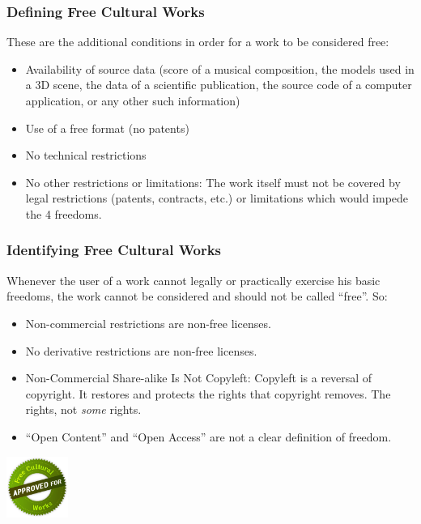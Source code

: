 
\begin{frame}
\frametitle{Defining Free Cultural Works}

These are the additional conditions in order for a work to be considered free:

\begin{itemize}
\item \alert{Availability of source data} (score of a musical composition, the models used in a 3D scene, the data of a scientific publication, the source code of a computer application, or any other such information)
\item \alert{Use of a free format} (no patents)
\item \alert{No technical restrictions}
\item \alert{No other restrictions or limitations:} The work itself must not be covered by legal restrictions (patents, contracts, etc.) or limitations which would impede the 4 freedoms.
\end{itemize}                                                 

\end{frame}



\begin{frame}
\frametitle{Identifying Free Cultural Works}

Whenever the user of a work cannot legally or practically exercise his basic freedoms, the work cannot be considered and should not be called ``free''. So: 

\begin{itemize}
\item \alert{Non-commercial} restrictions are \alert{non-free} licenses.
\item \alert{No derivative} restrictions are \alert{non-free} licenses. 
\item \alert{Non-Commercial Share-alike} Is Not Copyleft: Copyleft is a reversal of copyright. It restores and protects the rights that copyright removes. \alert{The} rights, not \textit{some} rights.
\item ``Open Content'' and ``Open Access'' are \alert{not} a clear definition of freedom. 
\end{itemize}                                                 

\begin{center}
\includegraphics[width=2cm]{figs/seal.png}

\end{center}


\end{frame}


